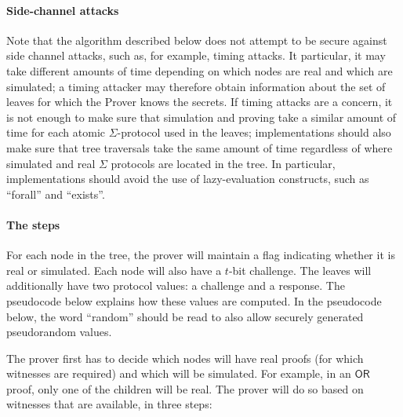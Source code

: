 \documentclass[11pt]{article}
\newcommand{\ornode}{\ensuremath{\mathsf{OR}}}
\begin{document}
\paragraph{Side-channel attacks}
Note that the algorithm described below does not attempt to be secure against side channel attacks, such as, for example, timing attacks. It particular, it may take different amounts of time depending on which nodes are real and which are simulated; a timing attacker may therefore obtain information about the set of leaves for which the Prover knows the secrets. If timing attacks are a concern, it is not enough to make sure that simulation and proving take a similar amount of time for each atomic $\Sigma$-protocol used in the leaves; implementations should also make sure that tree traversals take the same amount of time regardless of where simulated and real $\Sigma$ protocols are located in the tree. In particular, implementations should avoid the use of lazy-evaluation constructs, such as ``forall'' and ``exists''.

\paragraph{The steps}
For each node in the tree, the prover will maintain a flag indicating whether it is real or simulated. Each node will also have a $t$-bit challenge. The leaves will additionally have two protocol values: a challenge and a response. The pseudocode below explains how these values are computed. In the pseudocode below, the word ``random'' should be read to also allow securely generated pseudorandom values.


The prover first has to decide which nodes will have real proofs (for which witnesses are required) and which will be simulated. For example, in an $\ornode$ proof, only one of the children will be real. The prover will do so based on witnesses that are available, in three steps:
\end{document}
